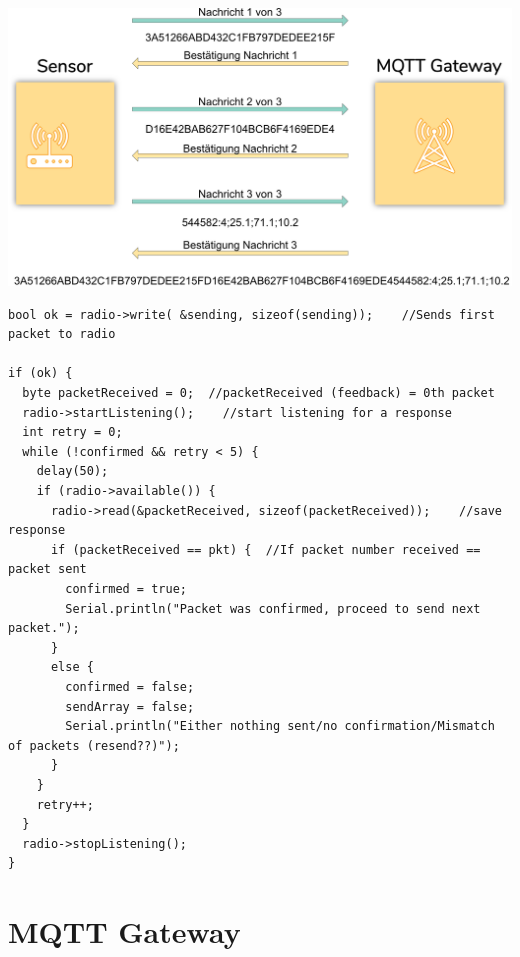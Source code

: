 \documentclass[
  12pt, %
  a4paper, %
  oneside, %
  openany, 
  numbers=noenddot, %
  BCOR=5mm, %
  parskip=half*, %
  thesis, %
]{bfhbook}
\begin{document}
\begin{center}
\includegraphics[width=17cm, left]{Bilder/Funkprotokoll.png}
 \captionsetup{justification=centering}
\label{radioprotocol}
\end{center}
\begin{verbatim}
bool ok = radio->write( &sending, sizeof(sending));    //Sends first packet to radio

if (ok) {
  byte packetReceived = 0;  //packetReceived (feedback) = 0th packet
  radio->startListening();    //start listening for a response
  int retry = 0;
  while (!confirmed && retry < 5) {
    delay(50);
    if (radio->available()) {
      radio->read(&packetReceived, sizeof(packetReceived));    //save response
      if (packetReceived == pkt) {  //If packet number received == packet sent
        confirmed = true;
        Serial.println("Packet was confirmed, proceed to send next packet.");
      }
      else {
        confirmed = false;
        sendArray = false;
        Serial.println("Either nothing sent/no confirmation/Mismatch of packets (resend??)");
      }
    }
    retry++;
  }
  radio->stopListening();
}
\end{verbatim}
\chapter{MQTT Gateway}
\end{document}
